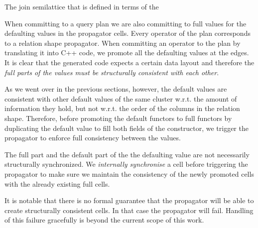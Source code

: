 \begin{code}

  \caption{\label{lst:defaulting_semigroup}The join semilattice that is defined in terms of the}
\end{code}

When committing to a query plan we are also committing to full values
for the defaulting values in the propagator cells. Every operator of
the plan corresponds to a relation shape propagator. When committing
an operator to the plan by translating it into C++ code, we promote
all the defaulting values at the edges. It is clear that the generated
code expects a certain data layout and therefore the \emph{full parts
of the values must be structurally consistent with each other}.

As we went over in the previous sections, however, the default values
are consistent with other default values of the same cluster
w.r.t. the amount of information they hold, but not w.r.t. the order
of the columns in the relation shape. Therefore, before promoting the
default functors to full functors by duplicating the default value to
fill both fields of the  constructor, we trigger
the propagator to enforce full consistency between the
 values.

The full part and the default part of the the defaulting value are not
necessarily structurally synchronized. We \emph{internally
synchronise} a cell before triggering the propagator to make sure we
maintain the consistency of the newly promoted cells with the already
existing full cells.

It is notable that there is no formal guarantee that the propagator
will be able to create structurally consistent cells. In that case the
propagator will fail. Handling of this failure gracefully is beyond
the current scope of this work.

